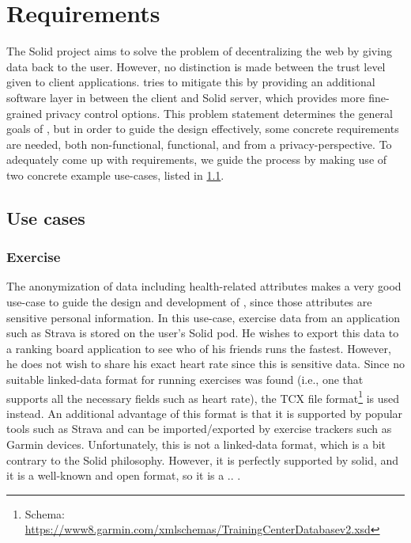 \chapter{Requirements}
\label{cha:middleware}
The Solid project aims to solve the problem of decentralizing the web by giving data back to the user. However, no distinction is made between the trust level given to client applications. \middleware{} tries to mitigate this by providing an additional software layer in between the client and Solid server, which provides more fine-grained privacy control options. This problem statement determines the general goals of \middleware{}, but in order to guide the design effectively, some concrete requirements are needed, both non-functional, functional, and from a privacy-perspective. To adequately come up with requirements, we guide the process by making use of two concrete example use-cases, listed in \ref{sec:usecases}.   

\section{Use cases}
\label{sec:usecases}
\subsection{Exercise}
The anonymization of data including health-related attributes makes a very good use-case to guide the design and development of \middleware{}, since those attributes are sensitive personal information. In this use-case, exercise data from an application such as Strava is stored on the user's Solid pod. He wishes to export this data to a ranking board application to see who of his friends runs the fastest. However, he does not wish to share his exact heart rate since this is sensitive data. Since no suitable linked-data format for running exercises was found (i.e., one that supports all the necessary fields such as heart rate), the \gls{TCX} file format\footnote{Schema: \url{https://www8.garmin.com/xmlschemas/TrainingCenterDatabasev2.xsd}} is used instead. An additional advantage of this format is that it is supported by popular tools such as Strava and can be imported/exported by exercise trackers such as Garmin devices. Unfortunately, this is not a linked-data format, which is a bit contrary to the Solid philosophy. However, it is perfectly supported by solid, and it is a well-known and open format, so it is a .. .


